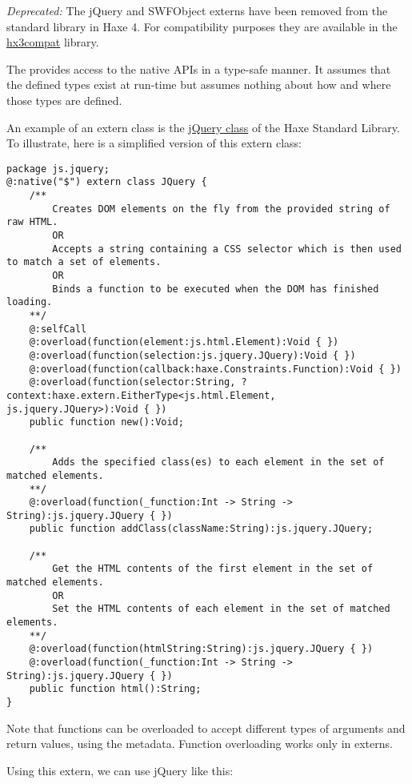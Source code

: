 
\emph{Deprecated:} The jQuery and SWFObject externs have been removed from the standard library in Haxe 4. For compatibility purposes they are available in the \href{https://github.com/HaxeFoundation/hx3compat/}{hx3compat} library.

The  provides access to the native APIs in a type-safe manner. It assumes that the defined types exist at run-time but assumes nothing about how and where those types are defined. 

An example of an extern class is the \href{https://github.com/HaxeFoundation/haxe/blob/development/std/js/jquery/JQuery.hx}{jQuery class} of the Haxe Standard Library. 
To illustrate, here is a simplified version of this extern class:

\begin{lstlisting}
package js.jquery;
@:native("$") extern class JQuery {
	/**
		Creates DOM elements on the fly from the provided string of raw HTML.
		OR
		Accepts a string containing a CSS selector which is then used to match a set of elements.
		OR
		Binds a function to be executed when the DOM has finished loading.
	**/
	@:selfCall
	@:overload(function(element:js.html.Element):Void { })
	@:overload(function(selection:js.jquery.JQuery):Void { })
	@:overload(function(callback:haxe.Constraints.Function):Void { })
	@:overload(function(selector:String, ?context:haxe.extern.EitherType<js.html.Element, js.jquery.JQuery>):Void { })
	public function new():Void;

	/**
		Adds the specified class(es) to each element in the set of matched elements.
	**/
	@:overload(function(_function:Int -> String -> String):js.jquery.JQuery { })
	public function addClass(className:String):js.jquery.JQuery;

	/**
		Get the HTML contents of the first element in the set of matched elements.
		OR
		Set the HTML contents of each element in the set of matched elements.
	**/
	@:overload(function(htmlString:String):js.jquery.JQuery { })
	@:overload(function(_function:Int -> String -> String):js.jquery.JQuery { })
	public function html():String;
}
\end{lstlisting}

Note that functions can be overloaded to accept different types of arguments and return values, using the  metadata. Function overloading works only in externs.

Using this extern, we can use jQuery like this:

